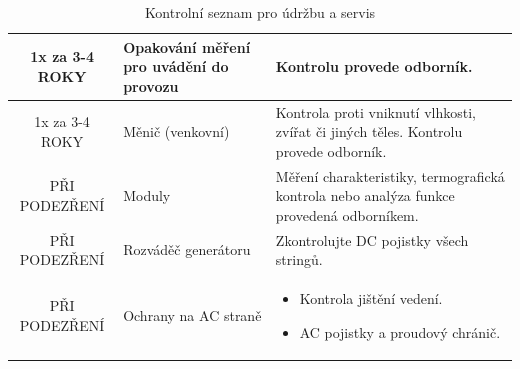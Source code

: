 \documentclass{book}
\begin{document}
\begin{table}
\begin{tabular}{|c|p{}|p{}|}
	\hline 
	1x za 3-4 ROKY & Opakování měření pro uvádění do provozu  & 
	Kontrolu provede odborník. \\ 
	\hline 
	1x za 3-4 ROKY & Měnič (venkovní)  & 
	Kontrola proti vniknutí vlhkosti, zvířat či jiných těles. Kontrolu provede odborník. \\ 
	\hline 
	PŘI PODEZŘENÍ & Moduly  & 
	Měření charakteristiky, termografická kontrola nebo analýza funkce provedená odborníkem. \\ 
	\hline 
	PŘI PODEZŘENÍ & Rozváděč generátoru  & 
	Zkontrolujte DC pojistky všech stringů. \\ 
	\hline 
	PŘI PODEZŘENÍ & Ochrany na AC straně  & 
	\begin{itemize}
	\item Kontrola jištění vedení.
	\item AC pojistky a proudový chránič.
	\end{itemize}
	 \\ 
	\hline 
	
	\end{tabular} 
	\caption{Kontrolní seznam pro údržbu a servis}
	\label{tabulka_kontrolni_seznam}
	\end{table}
	
\end{document}
